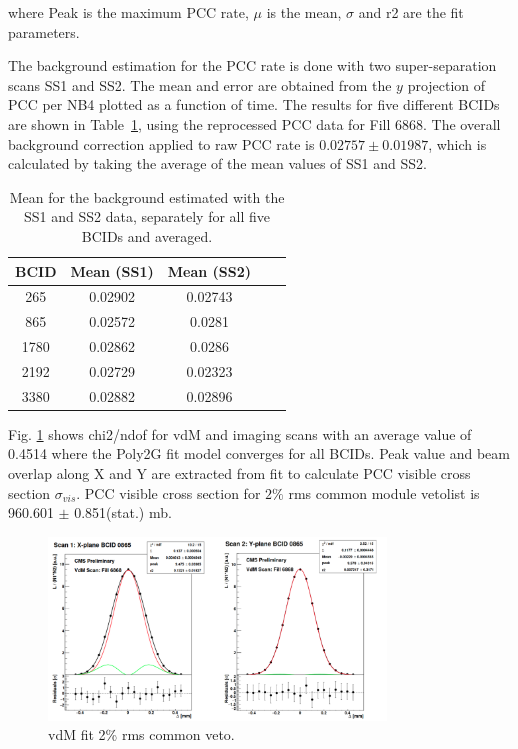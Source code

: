 where Peak is the maximum PCC rate, $\mu$ is the mean, $\sigma$ and r2 are the fit parameters. 

The background estimation for the PCC rate is done with two super-separation scans SS1 and SS2. The mean and error are obtained from the $y$ projection of PCC per NB4 plotted as a function of time. The results for five different BCIDs are shown in Table~\ref{tab:vdm:SS1_SS2}, using the reprocessed PCC data for Fill 6868. The overall background correction applied to raw PCC rate is $0.02757\pm0.01987$, which is calculated by taking the average of the mean values of SS1 and SS2.


\begin{table}
  \begin{center}
    \begin{tabular}{ccccc}
    \textbf{BCID}   & \textbf{Mean (SS1)} & \textbf{Mean (SS2)} \\ \hline
      265     &  0.02902    &  0.02743    \\
        865  &    0.02572  &     0.0281  \\
       1780    &  0.02862   &     0.0286  \\
       2192   &  0.02729  &     0.02323  \\
        3380  &  0.02882  &    0.02896   \\
      \end{tabular}
    \caption{Mean for the background estimated with the SS1 and SS2 data, separately for all five BCIDs and averaged.}
    \label{tab:vdm:SS1_SS2}
  \end{center}
\end{table}

Fig. \ref{fig:fitquality} shows chi2/ndof for vdM and imaging scans with an average value of 0.4514 where the Poly2G fit model converges for all BCIDs. Peak value and beam overlap along X and Y are extracted from fit to calculate PCC visible cross section $\sigma_{vis}$. PCC visible cross section for $2\%$ rms common module vetolist is 960.601 $\pm$ 0.851(stat.) mb.

\begin{figure}[h]
    \centering
    \includegraphics[width=0.8\textwidth]{ashish_thesis/vdM_fit_cveto.png}
    \caption{vdM fit 2\% rms common veto.}
    \label{fig:fitquality}
\end{figure}


